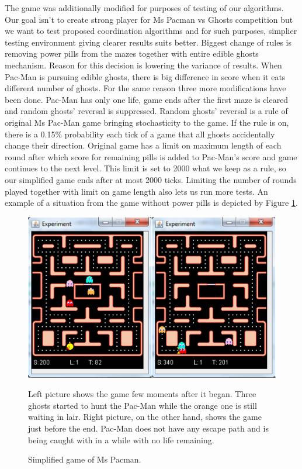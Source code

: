The game was
additionally modified for purposes of testing of our algorithms. 
Our goal isn't to create strong player for Ms Pacman vs Ghosts competition but we want to test
proposed coordination algorithms and for such purposes, simplier testing environment giving
clearer results suits better.
Biggest change of rules is
removing power pills from the mazes together with entire edible ghosts mechanism. Reason for
this decision is lowering the variance of results. When Pac-Man is pursuing edible ghosts,
there is big difference in score when it eats different number of ghosts. For the same reason
three more modifications have been done. Pac-Man has only one life, game ends after the first
maze is cleared and random ghosts' reversal is suppressed. Random ghosts' reversal is a rule of
original Ms Pac-Man game bringing stochasticity to the game. If the rule is on, there is a 0.15\% 
probability each tick of a game that all
ghosts accidentally change their direction. Original game has a limit on maximum length of each
round after which score for remaining pills is added to Pac-Man's score and game continues to
the next level. This limit is set to 2000 what we keep as a rule, so our simplified game ends
after at most 2000 ticks. Limiting the number of rounds played together with limit on game
length also lets us run more tests.
An example of a situation from the game without
power pills is depicted by Figure \ref{fig_pacman_framework}.

\begin{figure}
\begin{center}
\includegraphics[width=14cm]{img/pacman_framework.eps}
\end{center}
\caption{\footnotesize Simplified game of Ms Pacman.}{\footnotesize Left picture shows the game few moments after it began. Three
ghosts started to hunt the Pac-Man while the orange one is still waiting in lair. Right
picture, on the other hand, shows the game just before the end. Pac-Man does not have any
escape path and is being caught with in a while with no life remaining.}
\label{fig_pacman_framework}
\end{figure}

